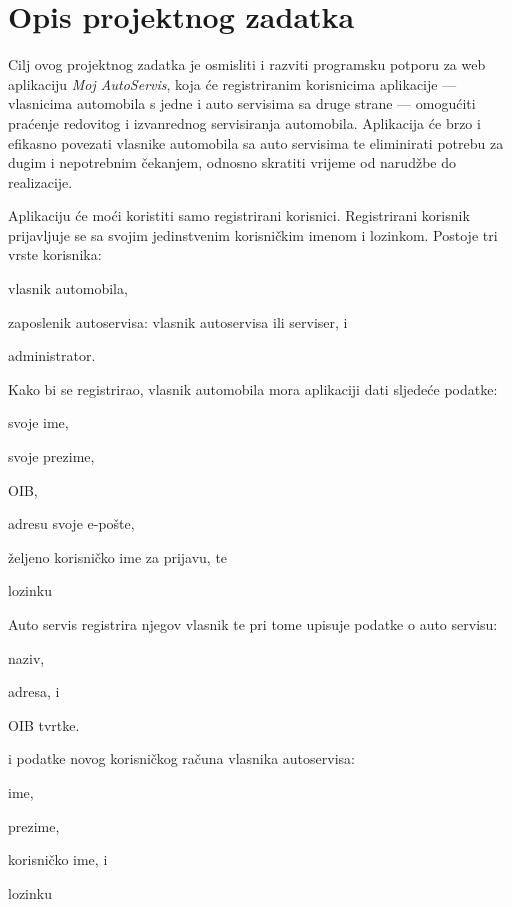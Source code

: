 \chapter{Opis projektnog zadatka}
		
		

		
		Cilj ovog projektnog zadatka je osmisliti i razviti programsku potporu  za web aplikaciju \textit{Moj AutoServis},  koja će registriranim korisnicima aplikacije --- vlasnicima automobila s jedne i auto servisima sa druge strane --- omogućiti praćenje redovitog i izvanrednog servisiranja automobila. Aplikacija će brzo i efikasno povezati  vlasnike automobila sa auto servisima te eliminirati potrebu za dugim i nepotrebnim čekanjem, odnosno skratiti vrijeme od narudžbe do realizacije. 
		
		
		
		
		Aplikaciju će moći koristiti samo registrirani korisnici. Registrirani korisnik prijavljuje se sa svojim jedinstvenim korisničkim imenom i lozinkom. Postoje tri vrste korisnika:
		\begin{packed_item}
			\item vlasnik automobila,
			\item zaposlenik autoservisa: vlasnik autoservisa ili serviser, i
			\item administrator.
		\end{packed_item}
		
		
		 Kako bi se registrirao, vlasnik automobila mora aplikaciji dati sljedeće podatke:
		\begin{packed_item}
			\item svoje ime,
			\item svoje prezime,
			\item OIB,
			\item adresu svoje e-pošte,
			\item željeno korisničko ime za prijavu, te
			\item lozinku
		\end{packed_item}
		
		Auto servis registrira njegov vlasnik te pri tome upisuje podatke o auto servisu:
		\begin{packed_item}
			\item naziv,
			\item adresa, i
			\item OIB tvrtke.
		\end{packed_item}
		i podatke novog korisničkog računa vlasnika autoservisa:
		\begin{packed_item}
			\item ime,
			\item prezime,
			\item korisničko ime, i
			\item lozinku
		\end{packed_item}
		
